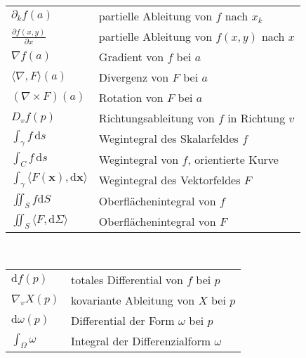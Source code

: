 \vspace{0.8em}\noindent
{}\\
\begin{tabular}{@{}l@{\enspace}l}
$\partial_k f(a)$ & partielle Ableitung von $f$ nach $x_k$\\
$\frac{\partial f(x,y)}{\partial x}$ & partielle Ableitung von $f(x,y)$ nach $x$\\
$\nabla f(a)$ & Gradient von $f$ bei $a$\\
$\langle\nabla,F\rangle(a)$ & Divergenz von $F$ bei $a$\\
$(\nabla\times F)(a)$ & Rotation von $F$ bei $a$\\
$D_v f(p)$ & Richtungsableitung von $f$ in Richtung $v$\\
$\int_\gamma f\,\mathrm ds$ & Wegintegral des Skalarfeldes $f$\\[4pt]
$\int_C f\,\mathrm ds$ & Wegintegral von $f$, orientierte Kurve\\[4pt]
$\int_\gamma \langle F(\mathbf x),\mathrm d\mathbf x\rangle$
& Wegintegral des Vektorfeldes $F$\\[4pt]
$\iint_S f\mathrm dS$ & Oberflächenintegral von $f$\\[4pt]
$\iint_S \langle F,\mathrm d\Sigma\rangle$ & Oberflächenintegral von $F$
\end{tabular}

\vspace{0.8em}\noindent
{}\\
\begin{tabular}{@{}ll}
$\mathrm df(p)$ & totales Differential von $f$ bei $p$\\
$\nabla_v X(p)$ & kovariante Ableitung von $X$ bei $p$\\
$\mathrm d\omega(p)$ & Differential der Form $\omega$ bei $p$\\
$\int_\Omega \omega$ & Integral der Differenzialform $\omega$
\end{tabular}

